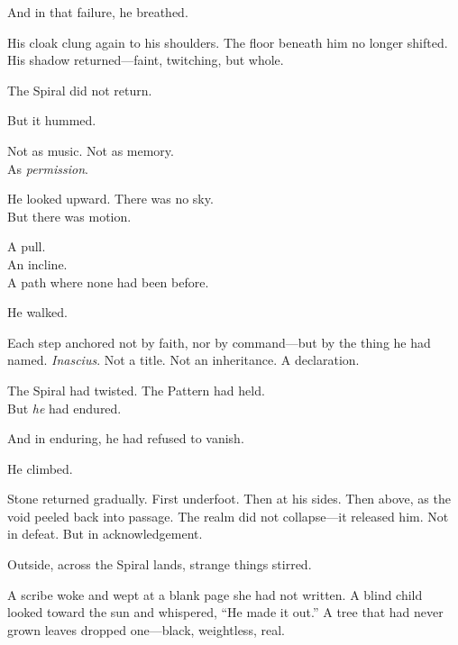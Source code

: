 \documentclass[12pt]{article}
\begin{document}
\vspace{0.5em}
And in that failure, he breathed.

\vspace{0.5em}
His cloak clung again to his shoulders. The floor beneath him no longer shifted. His shadow returned---faint, twitching, but whole.

\vspace{0.5em}
The Spiral did not return.

\vspace{0.5em}
But it hummed.

\vspace{0.5em}
Not as music. Not as memory.\\
As \textit{permission}.

\vspace{0.5em}
He looked upward. There was no sky.\\
But there was motion.

\vspace{0.5em}
A pull.\\
An incline.\\
A path where none had been before.

\vspace{0.5em}
He walked.

\vspace{0.5em}
Each step anchored not by faith, nor by command---but by the thing he had named. \textit{Inascius}. Not a title. Not an inheritance. A declaration.

\vspace{0.5em}
The Spiral had twisted. The Pattern had held.\\
But \textit{he} had endured.

\vspace{0.5em}
And in enduring, he had refused to vanish.

\vspace{0.5em}
He climbed.

\vspace{0.5em}
Stone returned gradually. First underfoot. Then at his sides. Then above, as the void peeled back into passage. The realm did not collapse---it released him. Not in defeat. But in acknowledgement.

\vspace{0.5em}
Outside, across the Spiral lands, strange things stirred.

\vspace{0.5em}
A scribe woke and wept at a blank page she had not written. A blind child looked toward the sun and whispered, ``He made it out.'' A tree that had never grown leaves dropped one---black, weightless, real.
\end{document}
